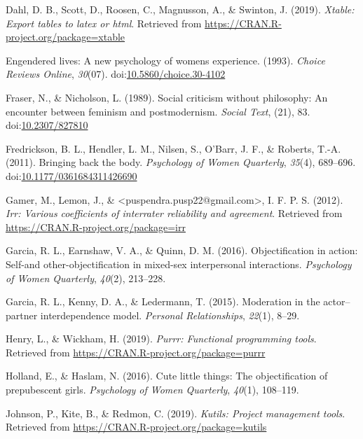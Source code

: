 \documentclass[man]{apa6}
\begin{document}
\hypertarget{ref-R-xtable}{}
Dahl, D. B., Scott, D., Roosen, C., Magnusson, A., \& Swinton, J.
(2019). \emph{Xtable: Export tables to latex or html}. Retrieved from
\url{https://CRAN.R-project.org/package=xtable}

\hypertarget{ref-Kaschak}{}
Engendered lives: A new psychology of womens experience. (1993).
\emph{Choice Reviews Online}, \emph{30}(07).
doi:\href{https://doi.org/10.5860/choice.30-4102}{10.5860/choice.30-4102}

\hypertarget{ref-frasernicholson1989}{}
Fraser, N., \& Nicholson, L. (1989). Social criticism without
philosophy: An encounter between feminism and postmodernism.
\emph{Social Text}, (21), 83.
doi:\href{https://doi.org/10.2307/827810}{10.2307/827810}

\hypertarget{ref-fredricksonetal2011}{}
Fredrickson, B. L., Hendler, L. M., Nilsen, S., O'Barr, J. F., \&
Roberts, T.-A. (2011). Bringing back the body. \emph{Psychology of Women
Quarterly}, \emph{35}(4), 689--696.
doi:\href{https://doi.org/10.1177/0361684311426690}{10.1177/0361684311426690}

\hypertarget{ref-R-irr}{}
Gamer, M., Lemon, J., \&
\textless{}puspendra.pusp22@gmail.com\textgreater{}, I. F. P. S. (2012).
\emph{Irr: Various coefficients of interrater reliability and
agreement}. Retrieved from \url{https://CRAN.R-project.org/package=irr}

\hypertarget{ref-garcia2016objectification}{}
Garcia, R. L., Earnshaw, V. A., \& Quinn, D. M. (2016). Objectification
in action: Self-and other-objectification in mixed-sex interpersonal
interactions. \emph{Psychology of Women Quarterly}, \emph{40}(2),
213--228.

\hypertarget{ref-garcia2015moderation}{}
Garcia, R. L., Kenny, D. A., \& Ledermann, T. (2015). Moderation in the
actor--partner interdependence model. \emph{Personal Relationships},
\emph{22}(1), 8--29.

\hypertarget{ref-R-purrr}{}
Henry, L., \& Wickham, H. (2019). \emph{Purrr: Functional programming
tools}. Retrieved from \url{https://CRAN.R-project.org/package=purrr}

\hypertarget{ref-holland2016}{}
Holland, E., \& Haslam, N. (2016). Cute little things: The
objectification of prepubescent girls. \emph{Psychology of Women
Quarterly}, \emph{40}(1), 108--119.

\hypertarget{ref-R-kutils}{}
Johnson, P., Kite, B., \& Redmon, C. (2019). \emph{Kutils: Project
management tools}. Retrieved from
\url{https://CRAN.R-project.org/package=kutils}
\end{document}
